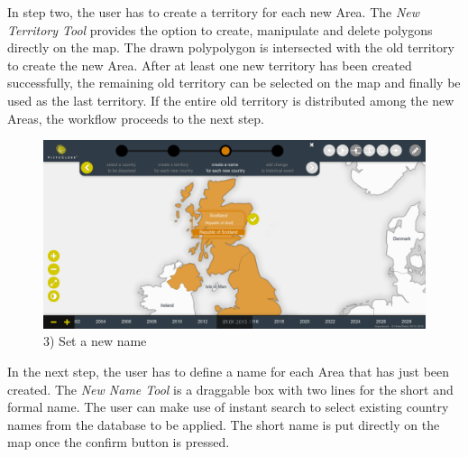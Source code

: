 \begin{landscape}
\begin{minipage}[t]{10cm}
    In step two, the user has to create a territory for each new Area. The \emph{New Territory Tool} provides the option to create, manipulate and delete polygons directly on the map. The drawn polypolygon is intersected with the old territory to create the new Area. After at least one new territory has been created successfully, the remaining old territory can be selected on the map and finally be used as the last territory. If the entire old territory is distributed among the new Areas, the workflow proceeds to the next step.

  \end{minipage}

  \vspace{1em}
  \begin{minipage}[t]{10cm}

    \begin{figure}[H]
      \centering
      \includegraphics[width=1.0\textwidth]{graphics/development/user_interface_design_process/5_set_new_name.png}
      \caption{3) Set a new name}
      \label{fig:final_5_set_new_name}
    \end{figure}

    In the next step, the user has to define a name for each Area that has just been created. The \emph{New Name Tool} is a draggable box with two lines for the short and formal name. The user can make use of instant search to select existing country names from the database to be applied. The short name is put directly on the map once the confirm button is pressed.

  \end{minipage}    %
  \hspace{1.5em}    %
  \begin{minipage}[t]{10cm}


\end{minipage}
\end{landscape}
